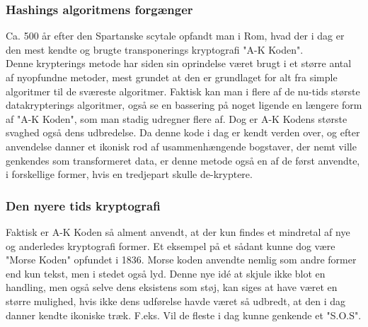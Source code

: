 \subsubsection{Hashings algoritmens forgænger}
Ca. 500 år efter den Spartanske scytale opfandt man i Rom, hvad der i dag er den mest kendte og brugte transponerings kryptografi "A-K Koden".
\cite{TheSecretLanguage}\\
Denne krypterings metode har siden sin oprindelse været brugt i et større antal af nyopfundne metoder, 
mest grundet at den er grundlaget for alt fra simple algoritmer til de sværeste algoritmer. 
Faktisk kan man i flere af de nu-tids største datakrypterings algoritmer, også se en bassering på noget ligende en længere form af "A-K Koden", som man stadig udregner flere af. 
Dog er A-K Kodens største svaghed også dens udbredelse. Da denne kode i dag er kendt verden over, og efter anvendelse danner et ikonisk rod af usammenhængende bogstaver, der nemt ville genkendes som transformeret data, er denne metode også en af de først anvendte, i forskellige former, hvis en tredjepart skulle de-kryptere.

\subsubsection{Den nyere tids kryptografi}
Faktisk er A-K Koden så alment anvendt, at der kun findes et mindretal af nye og anderledes kryptografi former. Et eksempel på et sådant kunne dog være "Morse Koden" opfundet i 1836. Morse koden anvendte nemlig som andre former end kun tekst, men i stedet også lyd. 
\cite{Telegraphing} Denne nye idé at skjule ikke blot en handling, men også selve dens eksistens som støj, kan siges at have været en større mulighed, hvis ikke dens udførelse havde været så udbredt, at den i dag danner kendte ikoniske træk. F.eks. Vil de fleste i dag kunne genkende et "S.O.S".

